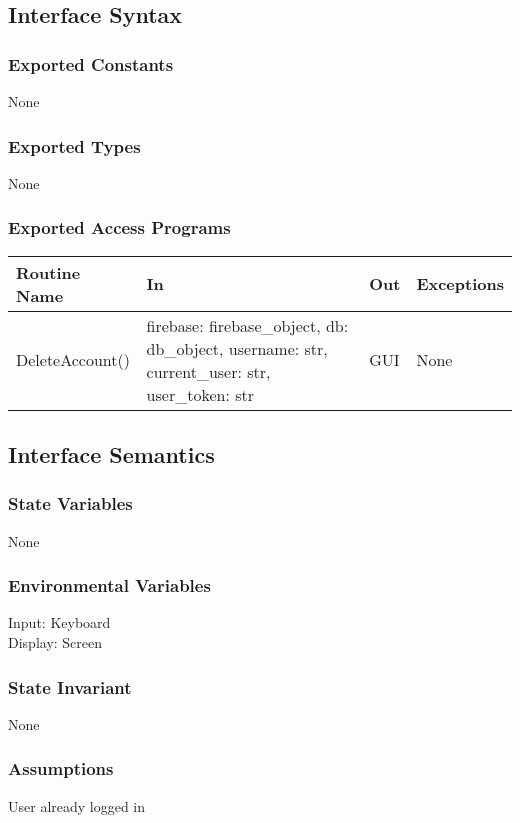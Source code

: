 \documentclass[12pt, titlepage]{article}
\begin{document}
\subsection* {Interface Syntax}
\subsubsection* {Exported Constants}
None

\subsubsection* {Exported Types}
None

\subsubsection* {Exported Access Programs}
\begin{table}[!htb]
    \centering
    \begin{tabular}{|p{3cm}|p{3cm}|p{3cm}|p{4.5cm}|}
        \hline
        \textbf{Routine Name} & \textbf{In} & \textbf{Out} & \textbf{Exceptions} \\
        \hline
         DeleteAccount() & firebase: firebase\_object, db: db\_object, username: str, current\_user: str, user\_token: str  & GUI & None\\
        \hline
    \end{tabular}
\end{table}

\subsection{Interface Semantics}
\subsubsection{State Variables}
None

\subsubsection{Environmental Variables}
Input: Keyboard\\
Display: Screen

\subsubsection{State Invariant}
None

\subsubsection{Assumptions}
User already logged in
\end{document}
